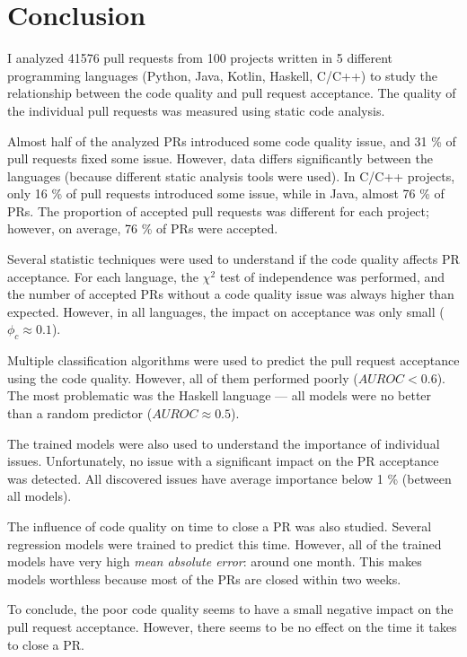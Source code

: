 \documentclass[digital,oneside,oldtable,nolof,nolot,nocover]{fithesis4}
\begin{document}
\chapter{Conclusion}
\label{sec:orgcce3be9}
I analyzed 41576 pull requests from 100 projects written in 5 different
programming languages (Python, Java, Kotlin, Haskell, C/C++) to study the
relationship between the code quality and pull request acceptance.  The
quality of the individual pull requests was measured using static code
analysis.

Almost half of the analyzed PRs introduced some code quality issue, and 31 \%
of pull requests fixed some issue. However, data differs significantly between
the languages (because different static analysis tools were used).  In C/C++
projects, only 16 \% of pull requests introduced some issue, while in Java,
almost 76 \% of PRs. The proportion of accepted pull requests was different for
each project; however, on average, 76 \% of PRs were accepted.

Several statistic techniques were used to understand if the code quality
affects PR acceptance. For each language, the \(\chi^2\) test of independence
was performed, and the number of accepted PRs without a code quality issue was always
higher than expected. However, in all languages, the impact on acceptance was
only small (\(\phi_c \approx 0.1\)).

Multiple classification algorithms were used to predict the pull request acceptance
using the code quality. However, all of them performed poorly (\(AUROC < 0.6\)).
The most problematic was the Haskell language --- all models were no better than a random
predictor (\(AUROC \approx 0.5\)).

The trained models were also used to understand the importance of individual issues.
Unfortunately, no issue with a significant impact on the PR acceptance was detected.
All discovered issues have average importance below 1 \% (between all models).

The influence of code quality on time to close a PR was also
studied. Several regression models were trained to predict this time. However,
all of the trained models have very high \emph{mean absolute error}: around one month.
This makes models worthless because most of the PRs are closed within two
weeks.

To conclude, the poor code quality seems to have a small negative impact on the
pull request acceptance. However, there seems to be no effect on the time it
takes to close a PR.
\end{document}
